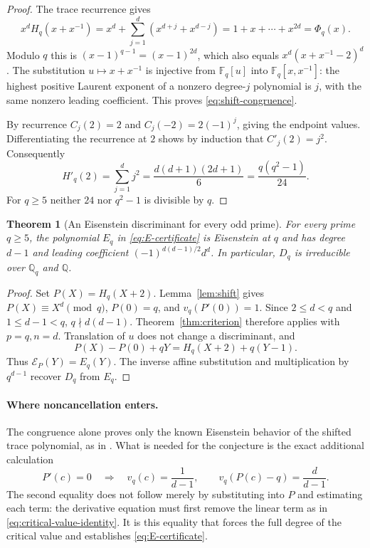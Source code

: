 \documentclass[11pt,a4paper]{article}
\newtheorem{theorem}{Theorem}[section]
\theoremstyle{definition}
\theoremstyle{remark}
\newcommand{\QQ}{\mathbb Q}
\newcommand{\FF}{\mathbb F}
\begin{document}
\begin{proof}
The trace recurrence gives
\[
 x^dH_q(x+x^{-1})
 =x^d+\sum_{j=1}^d(x^{d+j}+x^{d-j})
 =1+x+\cdots+x^{2d}=\Phi_q(x).
\]
Modulo $q$ this is $(x-1)^{q-1}=(x-1)^{2d}$, which also equals
$x^d(x+x^{-1}-2)^d$. The substitution
$u\mapsto x+x^{-1}$ is injective from $\FF_q[u]$ into
$\FF_q[x,x^{-1}]$: the highest positive Laurent exponent of a
nonzero degree-$j$ polynomial is $j$, with the same nonzero
leading coefficient. This proves \eqref{eq:shift-congruence}.

By recurrence $C_j(2)=2$ and $C_j(-2)=2(-1)^j$, giving the
endpoint values. Differentiating the recurrence at $2$ shows by
induction that $C'_j(2)=j^2$. Consequently
\[
 H'_q(2)=\sum_{j=1}^dj^2
 =\frac{d(d+1)(2d+1)}6
 =\frac{q(q^2-1)}{24}.
\]
For $q\ge5$ neither $24$ nor $q^2-1$ is divisible by $q$.
\end{proof}

\begin{theorem}[An Eisenstein discriminant for every odd prime]
\label{thm:Eq}
For every prime $q\ge5$, the polynomial $E_q$ in
\eqref{eq:E-certificate} is Eisenstein at $q$ and has degree
$d-1$ and leading coefficient $(-1)^{d(d-1)/2}d^d$.
In particular, $D_q$ is irreducible over $\QQ_q$ and $\QQ$.
\end{theorem}

\begin{proof}
Set $P(X)=H_q(X+2)$. Lemma~\ref{lem:shift} gives
$P(X)\equiv X^d\pmod q$, $P(0)=q$, and $v_q(P'(0))=1$.
Since $2\le d<q$ and $1\le d-1<q$, $q\nmid d(d-1)$.
Theorem~\ref{thm:criterion} therefore applies with $p=q,n=d$.
Translation of $u$ does not change a discriminant, and
\[
 P(X)-P(0)+qY=H_q(X+2)+q(Y-1).
\]
Thus $\mathcal E_P(Y)=E_q(Y)$. The inverse affine substitution
and multiplication by $q^{d-1}$ recover $D_q$ from $E_q$.
\end{proof}

\paragraph{Where noncancellation enters.}
The congruence alone proves only the known Eisenstein behavior of
the shifted trace polynomial, as in \cite[Lemma~3.2]{Jones}.
What is needed for the conjecture is the exact additional calculation
\[
 P'(c)=0\quad\Longrightarrow\quad
 v_q(c)=\frac1{d-1},\qquad
 v_q(P(c)-q)=\frac d{d-1}.
\]
The second equality does not follow merely by substituting into
$P$ and estimating each term: the derivative equation must first
remove the linear term as in \eqref{eq:critical-value-identity}.
It is this equality that forces the full degree of the critical
value and establishes \eqref{eq:E-certificate}.
\end{document}
